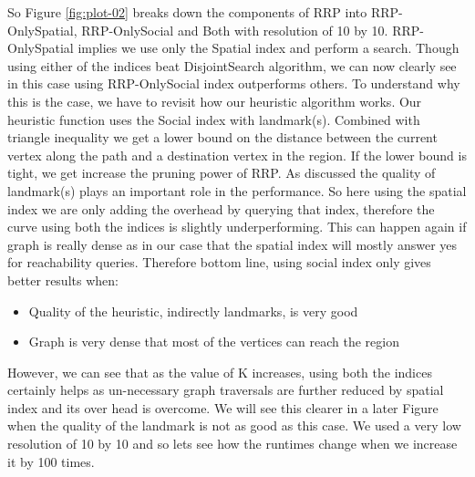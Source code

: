 So Figure \ref{fig:plot-02} breaks down the components of RRP into RRP-OnlySpatial, RRP-OnlySocial and Both with resolution of 10 by 10. RRP-OnlySpatial implies we use only the Spatial index and perform a search. Though using either of the indices beat DisjointSearch algorithm, we can now clearly see in this case using RRP-OnlySocial index outperforms others. To understand why this is the case, we have to revisit how our heuristic algorithm works. Our heuristic function uses the Social index with landmark(s). Combined with triangle inequality we get a lower bound on the distance between the current vertex along the path and a destination vertex in the region. If the lower bound is tight, we get increase the pruning power of RRP. As discussed the quality of landmark(s) plays an important role in the performance. So here using the spatial index we are only adding the overhead by querying that index, therefore the curve using both the indices is slightly underperforming. This can happen again if graph is really dense as in our case that the spatial index will mostly answer yes for reachability queries. Therefore bottom line, using social index only gives better results when:
\begin{itemize}
  \item Quality of the heuristic, indirectly landmarks, is very good
  \item Graph is very dense that most of the vertices can reach the region
\end{itemize}

However, we can see that as the value of K increases, using both the indices certainly helps as un-necessary graph traversals are further reduced by spatial index and its over head is overcome. We will see this clearer in a later Figure when the quality of the landmark is not as good as this case. We used a very low resolution of 10 by 10 and so lets see how the runtimes change when we increase it by 100 times.



